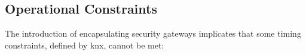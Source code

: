 

\subsection{Operational Constraints}

The introduction of encapsulating security gateways implicates that some timing constraints, defined by \gls{knx}, cannot be met:

